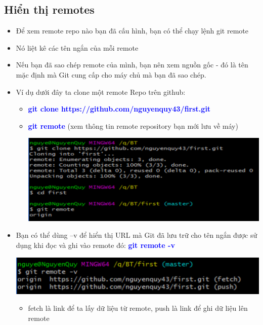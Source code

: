\documentclass[12pt,a4paper]{report}
\begin{document}
\subsection{Hiển thị remotes} 
\begin{itemize}
\item Để xem remote repo nào bạn đã cấu hình, bạn có thể chạy lệnh git remote
\item Nó liệt kê các tên ngắn của mỗi remote
\item Nếu bạn đã sao chép remote của mình, bạn nên xem nguồn gốc - đó là tên mặc định mà Git cung cấp cho máy chủ mà bạn đã sao chép. 
\item Ví dụ dưới đây ta clone một remote Repo trên github:
	\begin{itemize}
		\item \textcolor{blue}{\bf git clone https://github.com/nguyenquy43/first.git}
		\item \textcolor{blue}{\bf git remote} (xem thông tin remote repository bạn mới lưu về máy)

	\includegraphics[width=0.8\linewidth]{screenshot032}
	
	\label{fig:screenshot032}
	\end{itemize}
\item Bạn có thể dùng –v để hiển thị URL mà Git đã lưu trữ cho tên ngắn được sử dụng khi đọc và ghi vào remote đó: \textcolor{blue}{\bf git remote -v}

	\includegraphics[width=0.8\linewidth]{screenshot033}
	
	\label{fig:screenshot033}

	\begin{itemize}
\item fetch là link để ta lấy dữ liệu từ remote, push là link để ghi dữ liệu lên remote
\end{itemize}\end{itemize}
\end{document}
